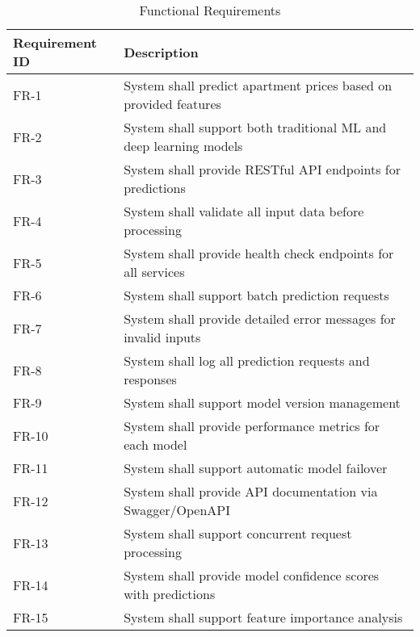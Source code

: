 \documentclass[12pt,a4paper]{report}
\begin{document}
\begin{table}[H]
\caption{Functional Requirements}
\begin{tabularx}{\textwidth}{|>{\hspace{0.5em}}p{}|>{\hspace{0.5em}}X|}
\hline
\textbf{Requirement ID} & \textbf{Description} \\
\hline
FR-1 & System shall predict apartment prices based on provided features \\
\hline
FR-2 & System shall support both traditional ML and deep learning models \\
\hline
FR-3 & System shall provide RESTful API endpoints for predictions \\
\hline
FR-4 & System shall validate all input data before processing \\
\hline
FR-5 & System shall provide health check endpoints for all services \\
\hline
FR-6 & System shall support batch prediction requests \\
\hline
FR-7 & System shall provide detailed error messages for invalid inputs \\
\hline
FR-8 & System shall log all prediction requests and responses \\
\hline
FR-9 & System shall support model version management \\
\hline
FR-10 & System shall provide performance metrics for each model \\
\hline
FR-11 & System shall support automatic model failover \\
\hline
FR-12 & System shall provide API documentation via Swagger/OpenAPI \\
\hline
FR-13 & System shall support concurrent request processing \\
\hline
FR-14 & System shall provide model confidence scores with predictions \\
\hline
FR-15 & System shall support feature importance analysis \\
\hline
\end{tabularx}
\end{table}
\end{document}
